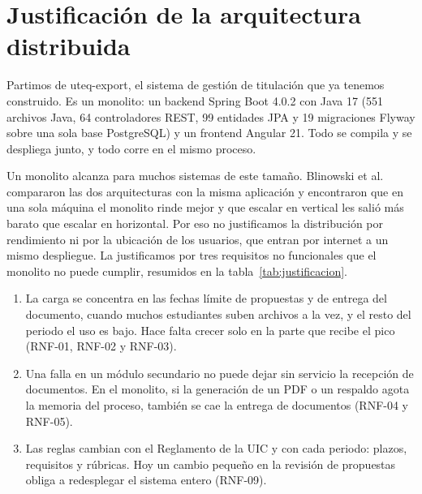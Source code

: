 \section{Justificación de la arquitectura distribuida}\label{sec:justificacion}

Partimos de uteq-export, el sistema de gestión de titulación que ya tenemos construido. Es un monolito: un backend Spring Boot 4.0.2 con Java 17 (551 archivos Java, 64 controladores REST, 99 entidades JPA y 19 migraciones Flyway sobre una sola base PostgreSQL) y un frontend Angular 21. Todo se compila y se despliega junto, y todo corre en el mismo proceso.

Un monolito alcanza para muchos sistemas de este tamaño. Blinowski et al.~\cite{blinowski2022monolithic} compararon las dos arquitecturas con la misma aplicación y encontraron que en una sola máquina el monolito rinde mejor y que escalar en vertical les salió más barato que escalar en horizontal. Por eso no justificamos la distribución por rendimiento ni por la ubicación de los usuarios, que entran por internet a un mismo despliegue. La justificamos por tres requisitos no funcionales que el monolito no puede cumplir, resumidos en la tabla~\ref{tab:justificacion}.

\begin{enumerate}
  \item La carga se concentra en las fechas límite de propuestas y de entrega del documento, cuando muchos estudiantes suben archivos a la vez, y el resto del periodo el uso es bajo. Hace falta crecer solo en la parte que recibe el pico (RNF-01, RNF-02 y RNF-03).
  \item Una falla en un módulo secundario no puede dejar sin servicio la recepción de documentos. En el monolito, si la generación de un PDF o un respaldo agota la memoria del proceso, también se cae la entrega de documentos (RNF-04 y RNF-05).
  \item Las reglas cambian con el Reglamento de la UIC y con cada periodo: plazos, requisitos y rúbricas. Hoy un cambio pequeño en la revisión de propuestas obliga a redesplegar el sistema entero (RNF-09).
\end{enumerate}

